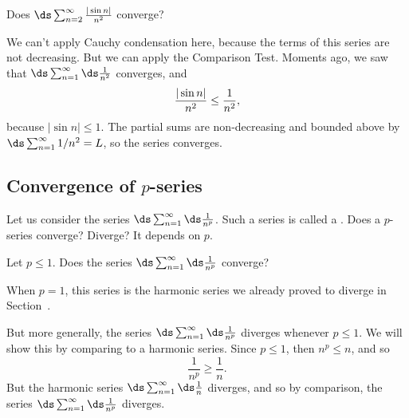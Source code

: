 \begin{example} Does $\ds\sum_{n=2}^\infty {|\sin n|\over n^2}$ converge?
\label{example:absolute-sine-over-n-squared}
\end{example}

\begin{solution}
  We can't apply Cauchy condensation here, because the terms of this series
  are not decreasing.  But we can apply the Comparison Test.  Moments ago, we
  saw that $\ds\sum_{n=1}^\infty \ds\frac{1}{n^2}$ converges, and
$$ {|\sin n|\over n^2}\le {1\over n^2},$$
because $|\sin n|\le 1$.  The partial sums are
non-decreasing and bounded above by $\ds \sum_{n=1}^\infty 1/n^2=L$, so the series
converges. 
\end{solution}


\subsection{Convergence of $p$-series}
\label{subsection:p-series}

Let us consider the series $\ds\sum_{n=1}^\infty \ds\frac{1}{n^p}$.  Such a series is called a .
Does a $p$-series converge?  Diverge?  It depends on $p$.

\begin{example}
\label{example:p-series-p-leq-1}
Let $p \leq 1$.  Does the series $\ds\sum_{n=1}^\infty \ds\frac{1}{n^p}$ converge?
\end{example}

\begin{solution}
  When $p=1$, this series is the harmonic series we already proved to diverge
  in Section~. 

  But more generally, the series $\ds\sum_{n=1}^\infty \ds\frac{1}{n^p}$ diverges whenever
  $p \leq 1$.  We will show this by comparing to a harmonic series.
  Since $p \leq 1$, then $n^p \leq n$, and so
$$
\frac{1}{n^p} \geq \frac{1}{n}.
$$
But the harmonic series $\ds\sum_{n=1}^\infty \ds\frac{1}{n}$
diverges, and so by comparison, the series $\ds\sum_{n=1}^\infty
\ds\frac{1}{n^p}$ diverges.
\end{solution}

